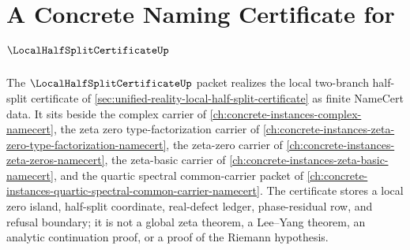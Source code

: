 \chapter{A Concrete Naming Certificate for $\LocalHalfSplitCertificateUp$}
\label{ch:concrete-instances-local-half-split-certificate-namecert}

The $\LocalHalfSplitCertificateUp$ packet realizes the local two-branch half-split certificate of \autoref{sec:unified-reality-local-half-split-certificate} as finite NameCert data. It sits beside the complex carrier of \autoref{ch:concrete-instances-complex-namecert}, the zeta zero type-factorization carrier of \autoref{ch:concrete-instances-zeta-zero-type-factorization-namecert}, the zeta-zero carrier of \autoref{ch:concrete-instances-zeta-zeros-namecert}, the zeta-basic carrier of \autoref{ch:concrete-instances-zeta-basic-namecert}, and the quartic spectral common-carrier packet of \autoref{ch:concrete-instances-quartic-spectral-common-carrier-namecert}. The certificate stores a local zero island, half-split coordinate, real-defect ledger, phase-residual row, and refusal boundary; it is not a global zeta theorem, a Lee--Yang theorem, an analytic continuation proof, or a proof of the Riemann hypothesis.

